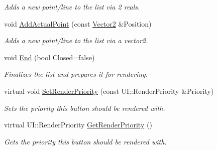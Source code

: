 \begin{DoxyCompactItemize}
\begin{DoxyCompactList}\small\item\em Adds a new point/line to the list via 2 reals. \item\end{DoxyCompactList}\item 
void \hyperlink{classphys_1_1UI_1_1LineList_a298919a32f4b41ce9414c47f26122778}{AddActualPoint} (const \hyperlink{classphys_1_1Vector2}{Vector2} \&Position)
\begin{DoxyCompactList}\small\item\em Adds a new point/line to the list via a vector2. \item\end{DoxyCompactList}\item 
void \hyperlink{classphys_1_1UI_1_1LineList_a8ea40817665ec539b4ff97a64b73317f}{End} (bool Closed=false)
\begin{DoxyCompactList}\small\item\em Finalizes the list and prepares it for rendering. \item\end{DoxyCompactList}\item 
virtual void \hyperlink{classphys_1_1UI_1_1LineList_aaa62a555258c3572f3d994de38028f01}{SetRenderPriority} (const UI::RenderPriority \&Priority)
\begin{DoxyCompactList}\small\item\em Sets the priority this button should be rendered with. \item\end{DoxyCompactList}\item 
virtual UI::RenderPriority \hyperlink{classphys_1_1UI_1_1LineList_a95aa150344304a49d8f6c6024d6a5351}{GetRenderPriority} ()
\begin{DoxyCompactList}\small\item\em Gets the priority this button should be rendered with. \item\end{DoxyCompactList}\end{DoxyCompactItemize}
